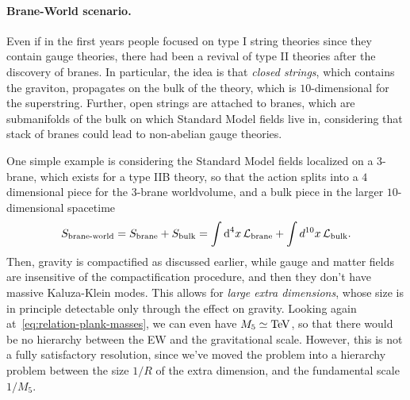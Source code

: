 \paragraph{Brane-World scenario.}
Even if in the first years people focused on type I string theories since they contain gauge theories, there had been a revival of type II theories after the discovery of branes. In particular, the idea is that \emph{closed strings}, which contains the graviton, propagates on the bulk of the theory, which is $10$-dimensional for the superstring. Further, open strings are attached to branes, which are submanifolds of the bulk on which Standard Model fields live in, considering that stack of branes could lead to non-abelian gauge theories. 

One simple example is considering the Standard Model fields localized on a $3$-brane, which exists for a type IIB theory, so that the action splits into a $4$ dimensional piece for the $3$-brane worldvolume, and a bulk piece in the larger $10$-dimensional spacetime
\begin{equation}
    S_\textup{brane-world} = S_\textup{brane} + S_\textup{bulk} = \int {\mathop{}\!\mathrm{d}}^4 x \, \mathcal{L}_\textup{brane} + \int d^{10} x \, \mathcal{L}_\textup{bulk} .
\end{equation}
Then, gravity is compactified as discussed earlier, while gauge and matter fields are insensitive of the compactification procedure, and then they don't have massive Kaluza-Klein modes. This allows for \emph{large extra dimensions}, whose size is in principle detectable only through the effect on gravity. Looking again at~\eqref{eq:relation-plank-masses}, we can even have $M_5 \simeq \textup{TeV}$, so that there would be no hierarchy between the EW and the gravitational scale. However, this is not a fully satisfactory resolution, since we've moved the problem into a hierarchy problem between the size $1/R$ of the extra dimension, and the fundamental scale $1/M_5$.